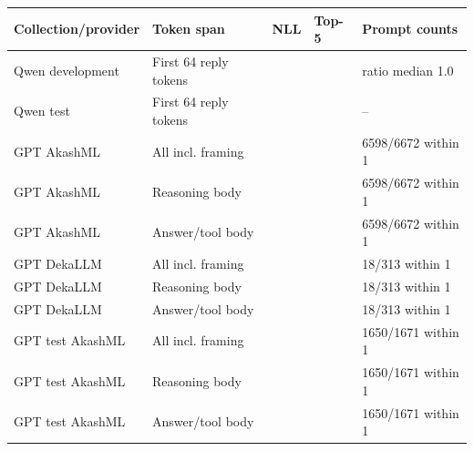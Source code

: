 \begin{tabular}{lllll}
\toprule
Collection/provider & Token span & NLL & Top-5 & Prompt counts \\
\midrule
Qwen development & First 64 reply tokens & \qwenReplayNLL{} & \qwenReplayTop{} & ratio median 1.0 \\
Qwen test & First 64 reply tokens & \qwenFreshReplayNLL{} & \qwenFreshReplayTop{} & -- \\
GPT AkashML & All incl. framing & \gptReplayAkashMLAllNLL{} & \gptReplayAkashMLAllTop{} & 6598/6672 within 1 \\
GPT AkashML & Reasoning body & \gptReplayAkashMLReasoningNLL{} & \gptReplayAkashMLReasoningTop{} & 6598/6672 within 1 \\
GPT AkashML & Answer/tool body & \gptReplayAkashMLAnswerNLL{} & \gptReplayAkashMLAnswerTop{} & 6598/6672 within 1 \\
GPT DekaLLM & All incl. framing & \gptReplayDekaLLMAllNLL{} & \gptReplayDekaLLMAllTop{} & 18/313 within 1 \\
GPT DekaLLM & Reasoning body & \gptReplayDekaLLMReasoningNLL{} & \gptReplayDekaLLMReasoningTop{} & 18/313 within 1 \\
GPT DekaLLM & Answer/tool body & \gptReplayDekaLLMAnswerNLL{} & \gptReplayDekaLLMAnswerTop{} & 18/313 within 1 \\
GPT test AkashML & All incl. framing & \gptFreshReplayAllNLL{} & \gptFreshReplayAllTop{} & 1650/1671 within 1 \\
GPT test AkashML & Reasoning body & \gptFreshReplayReasoningNLL{} & \gptFreshReplayReasoningTop{} & 1650/1671 within 1 \\
GPT test AkashML & Answer/tool body & \gptFreshReplayAnswerNLL{} & \gptFreshReplayAnswerTop{} & 1650/1671 within 1 \\
\bottomrule
\end{tabular}
